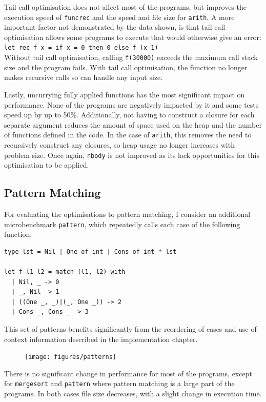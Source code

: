 Tail call optimisation does not affect most of the programs, but improves the execution speed of \verb|funcrec| and the speed and file size for \verb|arith|. A more important factor not demonstrated by the data shown, is that tail call optimisation allows some programs to execute that would otherwise give an error: \\
\verb|let rec f x = if x = 0 then 0 else f (x-1)| \\
Without tail call optimisation, calling \verb|f(30000)| exceeds the maximum call stack size and the program fails. With tail call optimisation, the function no longer makes recursive calls so can handle any input size.

Lastly, uncurrying fully applied functions has the most significant impact on performance. None of the programs are negatively impacted by it and some tests speed up by up to 50\%. Additionally, not having to construct a closure for each separate argument reduces the amount of space used on the heap and the number of functions defined in the code. In the case of \verb|arith|, this removes the need to recursively construct any closures, so heap usage no longer increases with problem size. Once again, \verb|nbody| is not improved as its lack opportunities for this optimisation to be applied.

\subsection{Pattern Matching}

For evaluating the optimisations to pattern matching, I consider an additional microbenchmark \verb|pattern|, which repeatedly calls each case of the following function:
\begin{verbatim}
type lst = Nil | One of int | Cons of int * lst

let f l1 l2 = match (l1, l2) with
  | Nil, _ -> 0
  | _, Nil -> 1
  | ((One _, _)|(_, One _)) -> 2
  | Cons _, Cons _ -> 3
\end{verbatim}
This set of patterns benefits significantly from the reordering of cases  and use of context information described in the implementation chapter. 


\begin{figure}[H]
\texttt{[image: figures/patterns]}
 \label{fig:patterns} 
\end{figure}

There is no significant change in performance for most of the programs, except for \verb|mergesort| and \verb|pattern| where pattern matching is a large part of the programs. In both cases file size decreases, with a slight change in execution time.

